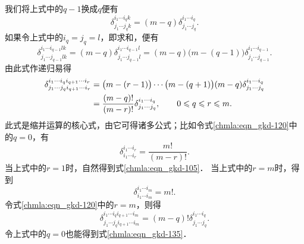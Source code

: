 我们将上式中的$q-1$换成$q$便有
\begin{equation}\label{chmla:eqn_gkd-110}
    \delta_{j_1 \cdots j_{q}k}^{i_1 \cdots i_{q}k} =
    (m-q) \delta_{j_1 \cdots j_{q}}^{i_1 \cdots i_{q}}.
\end{equation}
如果令上式中的$i_q=j_q=l$，即求和，便有
\begin{equation}\label{chmla:eqn_gkd-115}
    \delta_{j_1 \cdots j_{q-1}lk}^{i_1 \cdots i_{q-1}lk} =
    (m-q) \delta_{j_1 \cdots j_{q-1}l}^{i_1 \cdots i_{q-1}l}
    =(m-q)\bigl(m-(q-1)\bigr)   \delta_{j_1 \cdots j_{q-1}}^{i_1 \cdots i_{q-1}} .
\end{equation}
由此式作递归易得
\begin{align}
    \delta_{j_1 \cdots j_{q}i_{q+1}\cdots i_r }^{i_1 \cdots i_{q} i_{q+1}\cdots i_r}
    &=\bigl(m-(r-1)\bigr) \cdots \bigl(m-(q+1)\bigr) (m-q)
      \delta_{j_1 \cdots j_{q}}^{i_1 \cdots i_{q}} \notag \\
    &= \frac{(m-q)!}{(m-r)!} \delta_{j_1 \cdots j_{q}}^{i_1 \cdots i_{q}},
    \qquad 0 \leqslant q \leqslant r \leqslant m. \label{chmla:eqn_gkd-120}
\end{align}
此式是缩并运算的核心式，由它可得诸多公式；比如令式\eqref{chmla:eqn_gkd-120}中的$q=0$，有
\begin{equation}\label{chmla:eqn_gkd-130}
    \delta_{i_1 \cdots i_r }^{i_1 \cdots i_r} = \frac{m!}{(m-r)!}  .
\end{equation}
当上式中的$r=1$时，自然得到式\eqref{chmla:eqn_gkd-105}．
当上式中的$r=m$时，得到
\begin{equation}\label{chmla:eqn_gkd-135}
    \delta_{i_1 \cdots i_m }^{i_1 \cdots i_m} = m! .
\end{equation}
令式\eqref{chmla:eqn_gkd-120}中的$r=m$，则得
\begin{equation}\label{chmla:eqn_gkd-145}
    \delta_{j_1 \cdots j_{q}i_{q+1}\cdots i_m }^{i_1 \cdots i_{q} i_{q+1}\cdots i_m}
    = {(m-q)!} \delta_{j_1 \cdots j_{q}}^{i_1 \cdots i_{q}} .
\end{equation}
令上式中的$q=0$也能得到式\eqref{chmla:eqn_gkd-135}．


